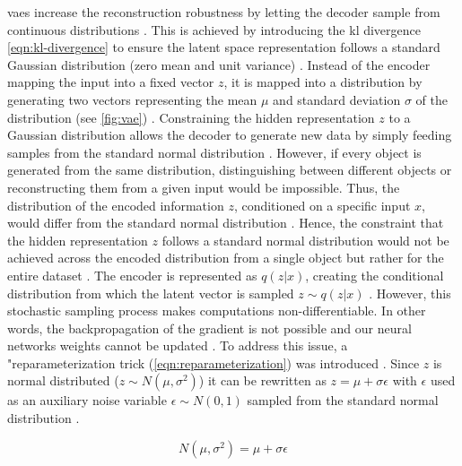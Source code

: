 \glspl{vae} increase the reconstruction robustness by letting the decoder sample from continuous distributions \cite{kingma2013AutoEncodingVariationalBayes}.
This is achieved by introducing the \gls{kl} divergence \autoref{eqn:kl-divergence} to ensure the latent space representation follows a standard Gaussian distribution (zero mean and unit variance) \cite{razghandi2022VariationalAutoencoderGenerativea, aggarwal2018NeuralNetworksDeep}.
Instead of the encoder mapping the input into a fixed vector $z$, it is mapped into a distribution by generating two vectors representing the mean $\mu$ and standard deviation $\sigma$ of the distribution (see \autoref{fig:vae}) \cite{razghandi2022VariationalAutoencoderGenerativea, aggarwal2018NeuralNetworksDeep}.
Constraining the hidden representation $z$ to a Gaussian distribution allows the decoder to generate new data by simply feeding samples from the standard normal distribution \cite{aggarwal2018NeuralNetworksDeep}.
However, if every object is generated from the same distribution, distinguishing between different objects or reconstructing them from a given input would be impossible.
Thus, the distribution of the encoded information $z$, conditioned on a specific input $x$, would differ from the standard normal distribution \cite{aggarwal2018NeuralNetworksDeep}. %
Hence, the constraint that the hidden representation $z$ follows a standard normal distribution would not be achieved across the encoded distribution from a single object but rather for the entire dataset \cite{aggarwal2018NeuralNetworksDeep}.
The encoder is represented as $q(z|x)$, creating the conditional distribution from which the latent vector is sampled $z\sim q(z|x)$ \cite{kingma2013AutoEncodingVariationalBayes}.
However, this stochastic sampling process makes computations non-differentiable.
In other words, the backpropagation of the gradient is not possible and our neural networks weights cannot be updated \cite{aggarwal2018NeuralNetworksDeep}.
To address this issue, a "reparameterization trick (\autoref{eqn:reparameterization}) was introduced \cite[p. 4]{kingma2013AutoEncodingVariationalBayes}.
Since $z$ is normal distributed ($z\sim N(\mu,\sigma^2)$) it can be rewritten as $z=\mu+\sigma\epsilon$ with $\epsilon$ used as an auxiliary noise variable $\epsilon \sim N(0,1)$ sampled from the standard normal distribution \cite{kingma2013AutoEncodingVariationalBayes}.

\begin{equation}
  \label{eqn:reparameterization}
  N(\mu,\sigma^2) =\mu+\sigma\epsilon
\end{equation}


